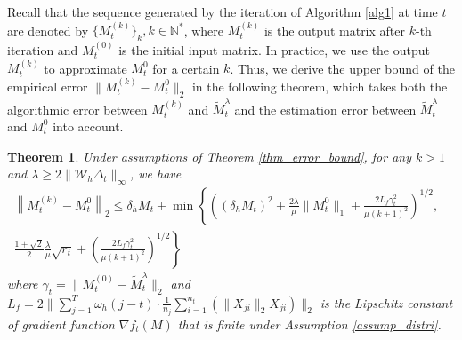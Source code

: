 \documentclass[12pt]{article}
\newtheorem{thm}{Theorem}
\begin{document}
Recall that the sequence generated by the iteration of Algorithm \ref{alg1} at time $t$ are denoted by $\{M^{(k)}_t\}_k,k\in \mathbb{N}^*$, where $M^{(k)}_t$ is the output matrix after $k$-th iteration and $M_t^{(0)}$ is the initial input matrix. %
In practice, we use the output $M^{(k)}_t$ to approximate $M_t^0$ for a certain $k$. 
Thus, we derive the upper bound of the empirical error $\big\|M_t^{(k)} - M_t^0\big\|_2$ in the following theorem, which takes both the algorithmic error between $M^{(k)}_t$ and $\widetilde{M}_t^\lambda$ and the estimation error between $\widetilde{M}_t^\lambda$ and $M_t^0$ into account.

\begin{thm}
	\label{thm_algorithm} Under assumptions of Theorem \ref{thm_error_bound},
	for any $k>1$ and $\lambda \ge 2\|\mathcal{W}_h\Delta_{t}\|_\infty$, we have
	\begin{equation*}
		\begin{aligned}
			\left\|M_t^{(k)} - M_t^0\right\|_2\le  \delta_h M_t +\min\left\{\left((\delta_h M_t)^2 +\frac{2\lambda}{\mu}\|M_t^0\|_1 + \frac{2L_f\gamma_t^2}{\mu(k+1)^2}\right)^{1/2},\right.&\\
  \left.\frac{1+\sqrt{2}}{2} \frac{\lambda}{\mu}\sqrt{r_t}+\left(\frac{2L_f \gamma_t^2}{\mu(k+1)^2}\right)^{1/2}\right\}& 
		\end{aligned}
	\end{equation*}
	where  $\gamma_t = \big\|M_t^{(0)}-\widetilde{M}^\lambda_t\big\|_2 $ and $L_f =2 \big\|\sum_{j=1}^T \omega_h(j-t)\cdot\frac{1}{n_j}\sum_{i=1}^{n_t} \left(\|X_{ji}\|_2X_{ji}\right)\big\|_2$
	 is the Lipschitz constant of gradient function $\nabla f_t(M)$ that is finite under Assumption \ref{assump_distri}.
\end{thm}
\end{document}
